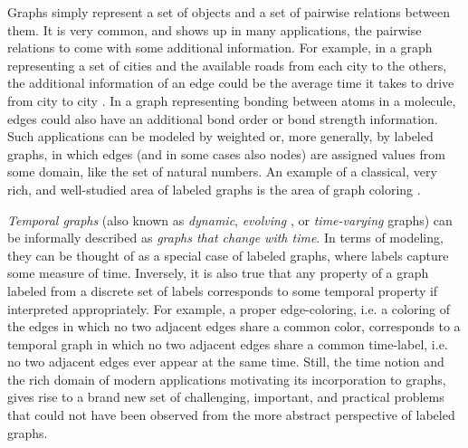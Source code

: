 \documentclass[oribibl, 11pt]{llncs}
\begin{document}
Graphs simply represent a set of objects and a set of pairwise relations between them. It is very common, and shows up in many applications, the pairwise relations to come with some additional information. For example, in a graph representing a set of cities and the available roads from each city to the others, the additional information of an edge  could be the average time it takes to drive from city  to city . In a graph representing bonding between atoms in a molecule, edges could also have an additional bond order or bond strength information. Such applications can be modeled by weighted or, more generally, by labeled graphs, in which edges (and in some cases also nodes) are assigned values from some domain, like the set of natural numbers. An example of a classical, very rich, and well-studied area of labeled graphs is the area of graph coloring \cite{MR02}.

\emph{Temporal graphs} (also known as \emph{dynamic}, \emph{evolving} \cite{Fe04}, or \emph{time-varying} \cite{FMS09,CFQS12} graphs) can be informally described as \emph{graphs that change with time}. In terms of modeling, they can be thought of as a special case of labeled graphs, where labels capture some measure of time. Inversely, it is also true that any property of a graph labeled from a discrete set of labels corresponds to some temporal property if interpreted appropriately. For example, a proper edge-coloring, i.e. a coloring of the edges in which no two adjacent edges share a common color, corresponds to a temporal graph in which no two adjacent edges share a common time-label, i.e. no two adjacent edges ever appear at the same time. Still, the time notion and the rich domain of modern applications motivating its incorporation to graphs, gives rise to a brand new set of challenging, important, and practical problems that could not have been observed from the more abstract perspective of labeled graphs.
\end{document}
